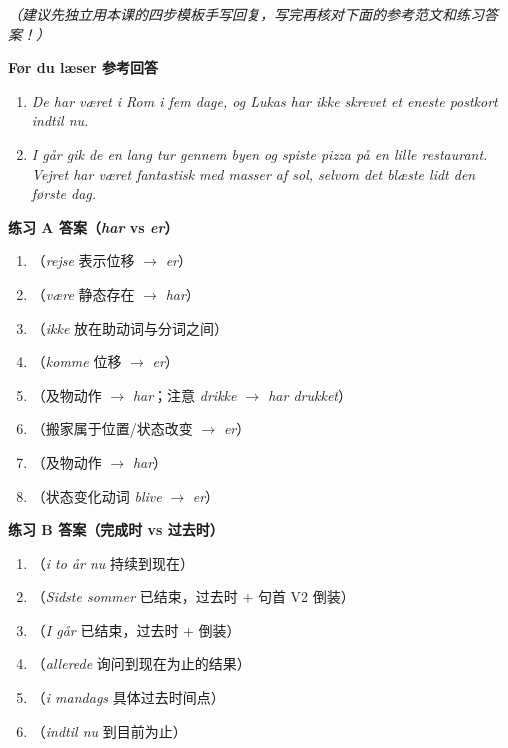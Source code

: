 \textit{（建议先独立用本课的四步模板手写回复，写完再核对下面的参考范文和练习答案！）}

\begin{answerbox}
\textbf{Før du læser 参考回答}
\begin{enumerate}
  \item \textit{De har været i Rom i fem dage, og Lukas har ikke skrevet et eneste postkort indtil nu.}
  \item \textit{I går gik de en lang tur gennem byen og spiste pizza på en lille restaurant. Vejret har været fantastisk med masser af sol, selvom det blæste lidt den første dag.}
\end{enumerate}

\textbf{练习 A 答案（\textit{har} vs \textit{er}）}
\begin{enumerate}
  \item {}（\textit{rejse} 表示位移 $\rightarrow$ \textit{er}）
  \item {}（\textit{være} 静态存在 $\rightarrow$ \textit{har}）
  \item {}（\textit{ikke} 放在助动词与分词之间）
  \item {}（\textit{komme} 位移 $\rightarrow$ \textit{er}）
  \item {}（及物动作 $\rightarrow$ \textit{har}；注意 \textit{drikke $\rightarrow$ har drukket}）
  \item {}（搬家属于位置/状态改变 $\rightarrow$ \textit{er}）
  \item {}（及物动作 $\rightarrow$ \textit{har}）
  \item {}（状态变化动词 \textit{blive} $\rightarrow$ \textit{er}）
\end{enumerate}

\textbf{练习 B 答案（完成时 vs 过去时）}
\begin{enumerate}
  \item {}（\textit{i to år nu} 持续到现在）
  \item {}（\textit{Sidste sommer} 已结束，过去时 + 句首 V2 倒装）
  \item {}（\textit{I går} 已结束，过去时 + 倒装）
  \item {}（\textit{allerede} 询问到现在为止的结果）
  \item {}（\textit{i mandags} 具体过去时间点）
  \item {}（\textit{indtil nu} 到目前为止）
\end{enumerate}


\end{answerbox}
